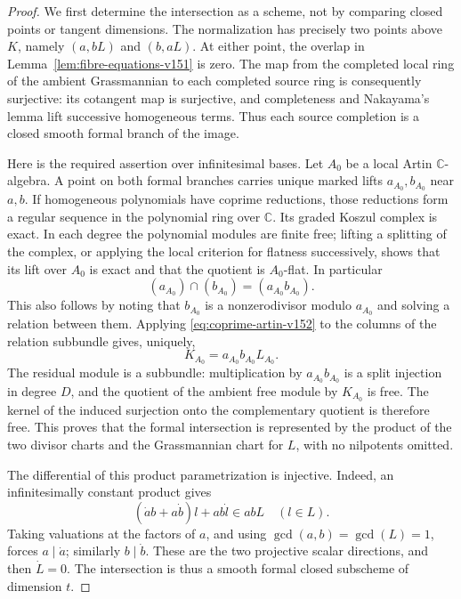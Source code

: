 \documentclass[11pt,reqno]{amsart}
\numberwithin{equation}{section}
\theoremstyle{definition}\newtheorem{definition}[theorem]{Definition}
\theoremstyle{remark}\newtheorem{remark}[theorem]{Remark}
\newcommand{\C}{\mathbb C}\newcommand{\Q}{\mathbb Q}
\begin{document}
\begin{proof}
We first determine the intersection as a scheme, not by comparing
closed points or tangent dimensions.  The normalization has precisely
two points above $K$, namely $(a,bL)$ and $(b,aL)$.  At either point,
the overlap in Lemma~\ref{lem:fibre-equations-v151} is zero.  The
map from the completed local ring of the ambient Grassmannian to
each completed source ring is consequently surjective: its cotangent
map is surjective, and completeness and Nakayama's lemma lift
successive homogeneous terms.  Thus each source completion is a
closed smooth formal branch of the image.

Here is the required assertion over infinitesimal bases.  Let $A_0$
be a local Artin $\C$-algebra.  A point on both formal branches carries
unique marked lifts $a_{A_0},b_{A_0}$ near $a,b$.  If homogeneous
polynomials have coprime reductions, those reductions form a regular
sequence in the polynomial ring over $\C$.  Its graded Koszul
complex is exact.  In each degree the polynomial modules are finite
free; lifting a splitting of the complex, or applying the local
criterion for flatness successively, shows that its lift over $A_0$
is exact and that the quotient is $A_0$-flat.  In particular
\begin{equation}\label{eq:coprime-artin-v152}
 (a_{A_0})\cap(b_{A_0})=(a_{A_0}b_{A_0}).
\end{equation}
This also follows by noting that $b_{A_0}$ is a nonzerodivisor
modulo $a_{A_0}$ and solving a relation between them.  Applying
\eqref{eq:coprime-artin-v152} to the columns of the relation
subbundle gives, uniquely,
\[
                  K_{A_0}=a_{A_0}b_{A_0}L_{A_0}.
\]
The residual module is a subbundle: multiplication by
$a_{A_0}b_{A_0}$ is a split injection in degree $D$, and the
quotient of the ambient free module by $K_{A_0}$ is free.  The
kernel of the induced surjection onto the complementary quotient
is therefore free.  This proves that the formal intersection is
represented by the product of the two divisor charts and the
Grassmannian chart for $L$, with no nilpotents omitted.

The differential of this product parametrization is injective.
Indeed, an infinitesimally constant product gives
\[
       (\dot a b+a\dot b)l+ab\dot l\in abL\quad(l\in L).
\]
Taking valuations at the factors of $a$, and using
$\gcd(a,b)=\gcd(L)=1$, forces $a\mid\dot a$; similarly
$b\mid\dot b$.  These are the two projective scalar directions,
and then $\dot L=0$.  The intersection is thus a smooth formal
closed subscheme of dimension $t$.


\end{proof}
\end{document}
